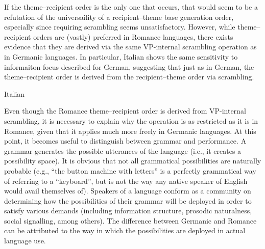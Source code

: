 If the theme--recipient order is the only one that occurs, that would seem to be a refutation of the universaility of a recipient--theme base generation order, especially since requiring scrambling seems unsatisfactory. However, while theme--recipient orders are (vastly) preferred in Romance languages, there exists evidence that they are derived via the same VP-internal scrambling operation as in Germanic languages. In particular, Italian shows the same sensitivity to informaiton focus described for German, suggesting that just as in German, the theme--recipient order is derived from the recipient--theme order via scrambling.

\begin{exe}
\ex Italian \citep[ex 26]{Belletti.1995}
\begin{xlist}
\end{xlist} 
\end{exe}%

Even though the Romance theme--recipient order is derived from VP-internal scrambling, it is necessary to explain why the operation is as restricted as it is in Romance, given that it applies much more freely in Germanic languages. At this point, it becomes useful to distinguish between grammar and performance. A grammar generates the possible utterances of the language (i.e., it creates a possibility space). It is obvious that not all grammatical possibilities are naturally probable (e.g., ``the button machine with letters'' is a perfectly grammatical way of referring to a ``keyboard'', but is not the way any native speaker of English would avail themselves of). Speakers of a language conform as a community on determining how the possibilities of their grammar will be deployed in order to satisfy various demands (including information structure, prosodic naturalness, social signalling, among others). The difference between Germanic and Romance can be attributed to the way in which the possibilities are deployed in actual language use.

